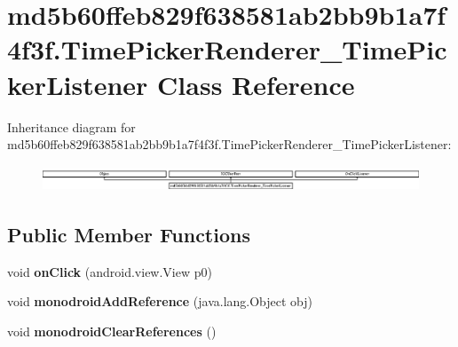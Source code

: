 \hypertarget{classmd5b60ffeb829f638581ab2bb9b1a7f4f3f_1_1TimePickerRenderer__TimePickerListener}{}\section{md5b60ffeb829f638581ab2bb9b1a7f4f3f.\+Time\+Picker\+Renderer\+\_\+\+Time\+Picker\+Listener Class Reference}
\label{classmd5b60ffeb829f638581ab2bb9b1a7f4f3f_1_1TimePickerRenderer__TimePickerListener}
Inheritance diagram for md5b60ffeb829f638581ab2bb9b1a7f4f3f.\+Time\+Picker\+Renderer\+\_\+\+Time\+Picker\+Listener\+:\begin{figure}[H]
\begin{center}
\leavevmode
\includegraphics[height=0.774550cm]{classmd5b60ffeb829f638581ab2bb9b1a7f4f3f_1_1TimePickerRenderer__TimePickerListener}
\end{center}
\end{figure}
\subsection*{Public Member Functions}
\begin{DoxyCompactItemize}
\item 
\mbox{\label{classmd5b60ffeb829f638581ab2bb9b1a7f4f3f_1_1TimePickerRenderer__TimePickerListener_a7c0e16ecc0f7f4dfae619b6a5d54735f}} 
void {\bfseries on\+Click} (android.\+view.\+View p0)
\item 
\mbox{\label{classmd5b60ffeb829f638581ab2bb9b1a7f4f3f_1_1TimePickerRenderer__TimePickerListener_afe1bfc01f47c143b432ba0f7940fec7f}} 
void {\bfseries monodroid\+Add\+Reference} (java.\+lang.\+Object obj)
\item 
\mbox{\label{classmd5b60ffeb829f638581ab2bb9b1a7f4f3f_1_1TimePickerRenderer__TimePickerListener_af0690b3918502ce5234039a049d1a107}} 
void {\bfseries monodroid\+Clear\+References} ()
\end{DoxyCompactItemize}
